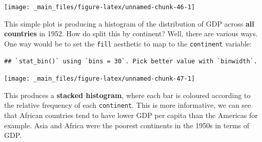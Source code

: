 \documentclass[]{book}
\newenvironment{Shaded}{\begin{snugshade}}{\end{snugshade}}
\newcommand{\KeywordTok}[1]{\textcolor[rgb]{0.13,0.29,0.53}{\textbf{{#1}}}}
\newcommand{\DataTypeTok}[1]{\textcolor[rgb]{0.13,0.29,0.53}{{#1}}}
\newcommand{\DecValTok}[1]{\textcolor[rgb]{0.00,0.00,0.81}{{#1}}}
\newcommand{\StringTok}[1]{\textcolor[rgb]{0.31,0.60,0.02}{{#1}}}
\newcommand{\NormalTok}[1]{{#1}}
\theoremstyle{definition}
\theoremstyle{definition}
\theoremstyle{definition}
\theoremstyle{remark}
\begin{document}
\begin{Shaded}
\end{Shaded}

\begin{center}\texttt{[image: \_main\_files/figure-latex/unnamed-chunk-46-1]} \end{center}

This simple plot is producing a histogram of the distribution of GDP
across \textbf{all countries} in 1952. How do split this by continent?
Well, there are various ways. One way would be to set the \texttt{fill}
aesthetic to map to the \texttt{continent} variable:

\begin{Shaded}
\end{Shaded}

\begin{verbatim}
## `stat_bin()` using `bins = 30`. Pick better value with `binwidth`.
\end{verbatim}

\begin{center}\texttt{[image: \_main\_files/figure-latex/unnamed-chunk-47-1]} \end{center}

This produces a \textbf{stacked histogram}, where each bar is coloured
according to the relative frequency of each \texttt{continent}. This is
more informative, we can see that African countries tend to have lower
GDP per capita than the Americas for example. Asia and Africa were the
poorest continents in the 1950s in terms of GDP.
\end{document}
